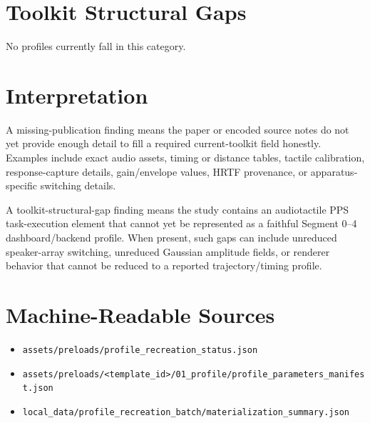 \documentclass[11pt]{article}
\begin{document}
\section*{Toolkit Structural Gaps}
No profiles currently fall in this category.

\section*{Interpretation}
A missing-publication finding means the paper or encoded source notes do not yet provide enough detail to fill a required current-toolkit field honestly. Examples include exact audio assets, timing or distance tables, tactile calibration, response-capture details, gain/envelope values, HRTF provenance, or apparatus-specific switching details.

A toolkit-structural-gap finding means the study contains an audiotactile PPS task-execution element that cannot yet be represented as a faithful Segment 0--4 dashboard/backend profile. When present, such gaps can include unreduced speaker-array switching, unreduced Gaussian amplitude fields, or renderer behavior that cannot be reduced to a reported trajectory/timing profile.

\section*{Machine-Readable Sources}
\begin{itemize}
\item \texttt{assets/preloads/profile\_recreation\_status.json}
\item \texttt{assets/preloads/<template\_id>/01\_profile/profile\_parameters\_manifest.json}
\item \texttt{local\_data/profile\_recreation\_batch/materialization\_summary.json}
\end{itemize}
\end{document}
